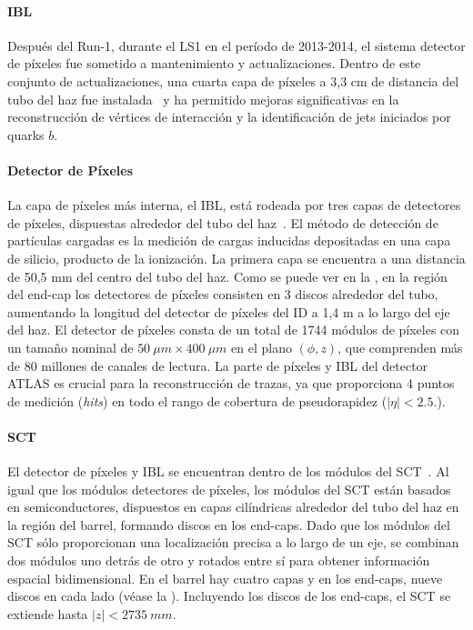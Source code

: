 \paragraph{\acf{IBL}}
Después del Run-1, durante el \ac{LS1} en el per\'iodo de 2013-2014, el sistema detector de píxeles fue sometido a mantenimiento y actualizaciones. Dentro de este conjunto de actualizaciones, una cuarta capa de píxeles a 3,3 cm de distancia del tubo del haz fue instalada~\cite{ATLAS-IBL-TDR,ATLAS-IBL-proceedings} y ha permitido mejoras significativas en la reconstrucción de vértices de interacción y la identificación de jets iniciados por quarks \(b\).


\paragraph{Detector de P\'ixeles}
La capa de píxeles más interna, el \ac{IBL}, está rodeada por tres capas de detectores de píxeles, dispuestas alrededor del tubo del haz~\cite{ATLAS-Pixel-DesignPerformance,ATLAS-Pixel-Performance-Proceedings}. El método de detección de partículas cargadas es la medición de cargas inducidas depositadas en una capa de silicio, producto de la ionización. La primera capa se encuentra a una distancia de 50,5 mm del centro del tubo del haz. Como se puede ver en la \Fig{\ref{fig:atlas:atlas:atlas_inner_detector:general}}, en la regi\'on del end-cap los detectores de píxeles consisten en 3 discos alrededor del tubo, aumentando la longitud del detector de píxeles del \ac{ID} a 1,4 m a lo largo del eje del haz. El detector de píxeles consta de un total de 1744 módulos de píxeles con un tamaño nominal de $50 ~\mu m \times 400 ~\mu m$ en el plano $(\phi, z)$, que comprenden más de 80 millones de canales de lectura.  
La parte de píxeles y \ac{IBL} del detector \ac{ATLAS} es crucial para la reconstrucci\'on de trazas, ya que proporciona 4 puntos de medici\'on (\textit{hits}) en todo el rango de cobertura de pseudorapidez ($|\eta| < 2.5.$).  

\paragraph{\acf{SCT}}
El detector de píxeles y \ac{IBL} se encuentran dentro de los módulos del \ac{SCT}~\cite{ATLAS-SCT}.  
Al igual que los módulos detectores de píxeles, los módulos del \ac{SCT} están basados en semiconductores, dispuestos en capas cilíndricas alrededor del tubo del haz en la región del barrel, formando discos en los end-caps. Dado que los módulos del \ac{SCT} sólo proporcionan una localización precisa a lo largo de un eje, se combinan dos módulos uno detrás de otro y rotados entre sí para obtener información espacial bidimensional. En el barrel hay cuatro capas y en los end-caps, nueve discos en cada lado (véase la \Fig{\ref{fig:atlas:atlas:atlas_inner_detector:general}}). Incluyendo los discos de los end-caps, el \ac{SCT} se extiende hasta $|z| < 2735~mm$.

